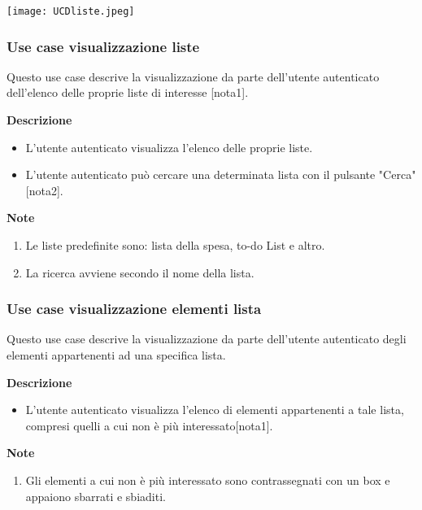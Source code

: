 \documentclass[a4paper,12pt]{article}
\begin{document}
\begin{center}
  \texttt{[image: UCDliste.jpeg]}
\end{center}
\subsubsection*{Use case visualizzazione liste}

Questo use case descrive la visualizzazione da parte dell'utente autenticato dell'elenco delle proprie liste di interesse [nota1].

\textbf{Descrizione}
\begin{itemize} \setlength\itemsep{0.01em}
\item L'utente autenticato visualizza l'elenco delle proprie liste.
\item L'utente autenticato può cercare una determinata lista con il pulsante "Cerca" [nota2].
\end{itemize}

\textbf{Note}
\begin{enumerate} \setlength\itemsep{0.01em}
\item Le liste predefinite sono: lista della spesa, to-do List e altro.
\item La ricerca avviene secondo il nome della lista.
\end{enumerate}




\subsubsection*{Use case visualizzazione elementi lista}

Questo use case descrive la visualizzazione da parte dell'utente autenticato degli elementi appartenenti ad una specifica lista.

\textbf{Descrizione}
\begin{itemize} \setlength\itemsep{0.01em}
\item L'utente autenticato visualizza l'elenco di elementi appartenenti a tale lista, compresi quelli a cui non è più interessato[nota1].
\end{itemize}

\textbf{Note}
\begin{enumerate} \setlength\itemsep{0.01em}
\item Gli elementi a cui non è più interessato sono contrassegnati con un box e appaiono sbarrati e sbiaditi.
\end{enumerate}
\end{document}
